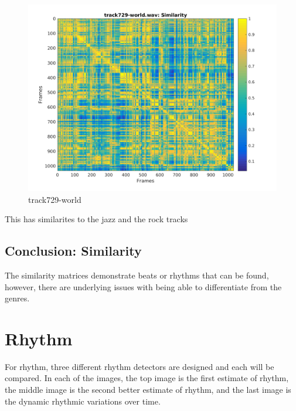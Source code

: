 \documentclass[11pt, a4paper]{article}
\begin{document}
\begin{figure}[H]
    \centering
    \includegraphics[width=.8\textwidth]{track729-world-similarity.png}
    \caption{track729-world}
\end{figure}

This has similarites to the jazz and the rock tracks

\subsection{Conclusion: Similarity}

The similarity matrices demonstrate beats or rhythms that can be found, however, there are underlying issues with being able to differentiate from the genres. 
	

\section{Rhythm}

For rhythm, three different rhythm detectors are designed and each will be compared. In each of the images, the top image is the first estimate of rhythm, the middle image is the second better estimate of rhythm, and the last image is the dynamic rhythmic variations over time. 








\end{document}
